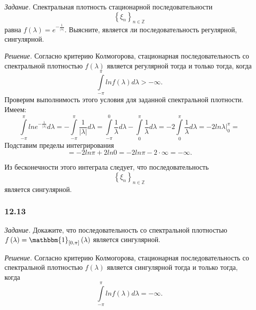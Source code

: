 \textit{Задание.}
Спектральная плотность стационарной последовательности
\begin{equation*}
  \left\{ \xi_n \right\}_{n \in \mathbb{Z}}
\end{equation*}
равна $f \left( \lambda \right) = e^{-\frac{1}{ \left| \lambda \right| }}$.
Выясните, является ли последовательность регулярной, сингулярной.

\textit{Решение.}
Согласно критерию Колмогорова,
стационарная последовательность со спектральной плотностью $f \left( \lambda \right) $
является регулярной тогда и только тогда, когда
\begin{equation*}
  \int \limits_{-\pi }^{ \pi } ln f \left( \lambda \right) d \lambda >
  -\infty.
\end{equation*}
Проверим выполнимость этого условия для заданной спектральной плотности.
Имеем:
\begin{equation*}
  \int \limits_{-\pi }^{ \pi } ln e^{-\frac{1}{ \left| \lambda \right| }} d \lambda =
  -\int \limits_{-\pi }^{ \pi } \frac{1}{ \left| \lambda \right| } d \lambda =
  \int \limits_{-\pi }^0 \frac{1}{ \lambda } d \lambda -
  \int \limits_0^{ \pi } \frac{1}{ \lambda } d \lambda =
  -2 \int \limits_0^{ \pi } \frac{1}{ \lambda } d \lambda =
  -2 \left. ln \lambda \right|_0^{ \pi } =
\end{equation*}
Подставим пределы интегрирования
\begin{equation*}
  = -2 ln \pi + 2 ln 0 =
  -2 ln \pi - 2 \cdot \infty =
  -\infty.
\end{equation*}

Из бесконечности этого интеграла следует,
что последовательность
\begin{equation*}
  \left\{ \xi_n \right\}_{n \in \mathbb{Z}}
\end{equation*}
является сингулярной.

\subsubsection*{12.13}

\textit{Задание.}
Докажите, что последовательность со спектральной плотностью
$f \left( \lambda \right) =
  \mathbbm{1}_{ \left[ 0, \pi \right] } \left( \lambda \right) $
является сингулярной.

\textit{Решение.}
Согласно критерию Колмогорова,
стационарная последовательность со спектральной плотностью $f \left( \lambda \right) $
является сингулярной тогда и только тогда, когда
\begin{equation*}
  \int \limits_{-\pi }^{ \pi } ln f \left( \lambda \right) d \lambda =
  -\infty.
\end{equation*}

